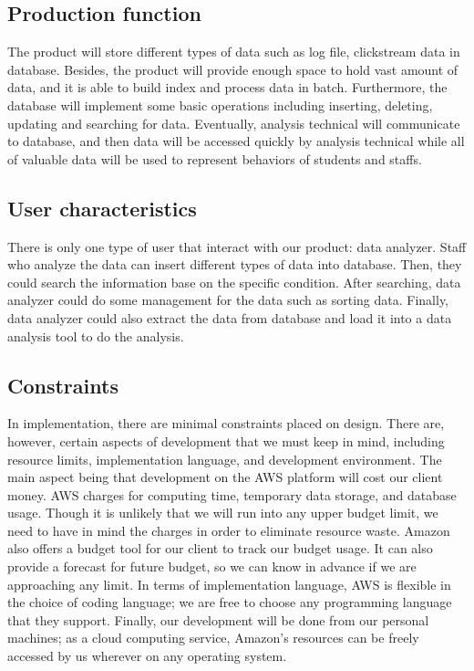  	\subsection{Production function}
       The product will store different types of data such as log file, clickstream data in database. Besides, the product will provide enough space to hold vast amount of data, and it is able to build index and process data in batch. Furthermore, the database will implement some basic operations including inserting, deleting, updating and searching for data. Eventually, analysis technical will communicate to database, and then data will be accessed quickly by analysis technical while all of valuable data will be used to represent behaviors of students and staffs.

	\subsection{User characteristics}
        There is only one type of user that interact with our product: data analyzer. Staff who analyze the data can insert different types of data into database. Then, they could search the information base on the specific condition. After searching, data analyzer could do some management for the data such as sorting data. Finally, data analyzer could also extract the data from database and load it into a data analysis tool to do the analysis. 

	\subsection{Constraints}
        In implementation, there are minimal constraints placed on design. There are, however, certain aspects of development that we must keep in mind, including resource limits, implementation language, and development environment. The main aspect being that development on the AWS platform will cost our client money. AWS charges for computing time, temporary data storage, and database usage. Though it is unlikely that we will run into any upper budget limit, we need to have in mind the charges in order to eliminate resource waste. Amazon also offers a budget tool for our client to track our budget usage. It can also provide a forecast for future budget, so we can know in advance if we are approaching any limit. In terms of implementation language, AWS is flexible in the choice of coding language; we are free to choose any programming language that they support. Finally, our development will be done from our personal machines; as a cloud computing service, Amazon’s resources can be freely accessed by us wherever on any operating system.

